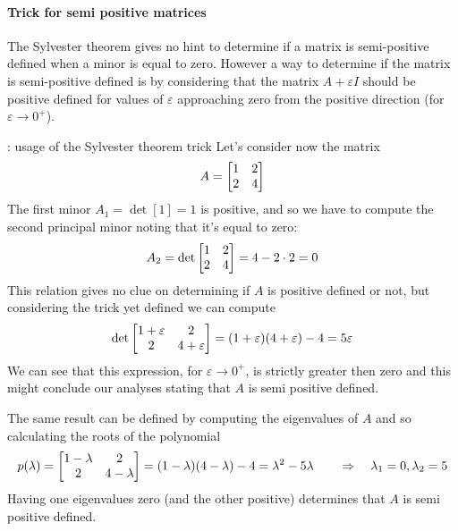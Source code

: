 		\paragraph{Trick for semi positive matrices} The Sylvester theorem gives no hint to determine if a matrix is semi-positive defined when a minor is equal to zero. However a way to determine if the matrix is semi-positive defined is by considering that the matrix $A +\varepsilon I$ should be positive defined for values of $\varepsilon$ approaching zero from the positive direction (for $\varepsilon\rightarrow 0^+$).
		
		\begin{example}{: usage of the Sylvester theorem trick}
			Let's consider now the matrix
			\[ A = \begin{bmatrix} 1 & 2 \\ 2 & 4 \end{bmatrix} \]
			The first minor $A_1 = \det[1] = 1$ is positive, and so we have to compute the second principal minor noting that it's equal to zero:
			\[ A_2 = \det\begin{bmatrix} 1 & 2 \\ 2 & 4 \end{bmatrix} = 4 - 2\cdot 2 = 0 \]
			This relation gives no clue on determining if $A$ is positive defined or not, but considering the trick yet defined we can compute 
			\[ \det\begin{bmatrix} 1+\varepsilon & 2 \\ 2 & 4 + \varepsilon \end{bmatrix} = (1+ \varepsilon)(4+\varepsilon) - 4 = 5\varepsilon \]
			We can see that this expression, for $\varepsilon \rightarrow 0^+$, is strictly greater then zero and this might conclude our analyses stating that $A$ is semi positive defined. \vspace{3mm}
			
			The same result can be defined by computing the eigenvalues of $A$ and so calculating the roots of the polynomial
			\[ p(\lambda) = \begin{bmatrix} 1-\lambda & 2 \\ 2 & 4-\lambda \end{bmatrix} = (1-\lambda)(4-\lambda) - 4 = \lambda^2-5\lambda \qquad \Rightarrow \quad \lambda_1 = 0, \lambda_2 = 5\]
			Having one eigenvalues zero (and the other positive) determines that $A$ is semi positive defined.			
		\end{example}
